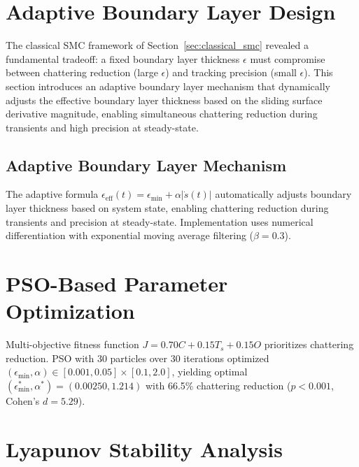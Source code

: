 \section{Adaptive Boundary Layer Design}
\label{sec:adaptive_boundary}

The classical SMC framework of Section~\ref{sec:classical_smc} revealed a fundamental tradeoff: a fixed boundary layer thickness $\epsilon$ must compromise between chattering reduction (large $\epsilon$) and tracking precision (small $\epsilon$). This section introduces an adaptive boundary layer mechanism that dynamically adjusts the effective boundary layer thickness based on the sliding surface derivative magnitude, enabling simultaneous chattering reduction during transients and high precision at steady-state.




\subsection{Adaptive Boundary Layer Mechanism}
The adaptive formula $\epsilon_{\text{eff}}(t) = \epsilon_{\min} + \alpha |\dot{s}(t)|$ automatically adjusts boundary layer thickness based on system state, enabling chattering reduction during transients and precision at steady-state. Implementation uses numerical differentiation with exponential moving average filtering ($\beta=0.3$).

\section{PSO-Based Parameter Optimization}
\label{sec:pso_optimization}

Multi-objective fitness function $J = 0.70C + 0.15T_s + 0.15O$ prioritizes chattering reduction. PSO with 30 particles over 30 iterations optimized $(\epsilon_{\min}, \alpha) \in [0.001,0.05] \times [0.1,2.0]$, yielding optimal $(\epsilon_{\min}^*, \alpha^*) = (0.00250, 1.214)$ with 66.5\% chattering reduction ($p<0.001$, Cohen's $d=5.29$).

\section{Lyapunov Stability Analysis}
\label{sec:lyapunov_stability}

